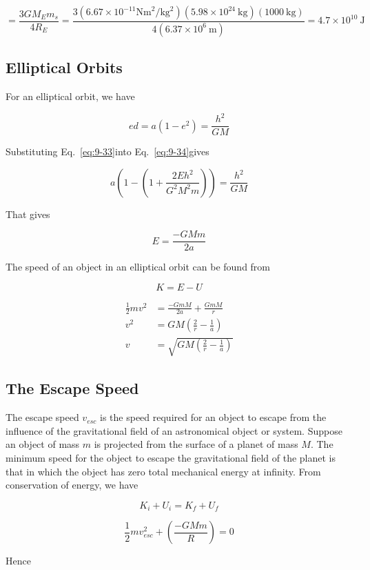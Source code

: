 \documentclass[10pt]{article}
\numberwithin{equation}{section}
\begin{document}
$$
=\frac{3 G M_{E} m_{s}}{4 R_{E}}=\frac{3\left(6.67 \times 10^{-11} \mathrm{Nm}^{2} / \mathrm{kg}^{2}\right)\left(5.98 \times 10^{24} \mathrm{~kg}\right)(1000 \mathrm{~kg})}{4\left(6.37 \times 10^{6} \mathrm{~m}\right)}=4.7 \times 10^{10} \mathrm{~J}
$$

\subsection{Elliptical Orbits}\label{sec:9-6}
For an elliptical orbit, we have


\begin{equation}
e d=a\left(1-e^{2}\right)=\frac{h^{2}}{G M} \label{eq:9-34}
\end{equation}


Substituting Eq.~\eqref{eq:9-33}into Eq.~\eqref{eq:9-34}gives

$$
a\left(1-\left(1+\frac{2 E h^{2}}{G^{2} M^{2} m}\right)\right)=\frac{h^{2}}{G M}
$$

That gives

$$
E=\frac{-G M m}{2 a}
$$

The speed of an object in an elliptical orbit can be found from

$$
K=E-U
$$

$$
\begin{aligned}
\frac{1}{2} m v^{2} & =\frac{-G m M}{2 a}+\frac{G m M}{r} \\
v^{2} & =G M\left(\frac{2}{r}-\frac{1}{a}\right) \\
v & =\sqrt{G M\left(\frac{2}{r}-\frac{1}{a}\right)}
\end{aligned}
$$

\subsection{The Escape Speed}\label{sec:9-7}
The escape speed $v_{e s c}$ is the speed required for an object to escape from the influence of the gravitational field of an astronomical object or system. Suppose an object of mass $m$ is projected from the surface of a planet of mass $M$. The minimum speed for the object to escape the gravitational field of the planet is that in which the object has zero total mechanical energy at infinity. From conservation of energy, we have

$$
K_{i}+U_{i}=K_{f}+U_{f}
$$

$$
\frac{1}{2} m v_{e s c}^{2}+\left(\frac{-G M m}{R}\right)=0
$$

Hence
\end{document}
